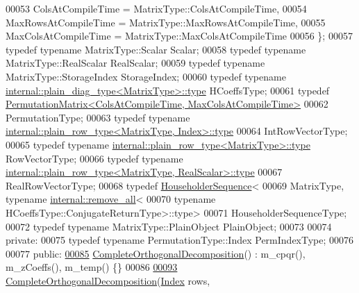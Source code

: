 \begin{DoxyCode}
00053     ColsAtCompileTime = MatrixType::ColsAtCompileTime,
00054     MaxRowsAtCompileTime = MatrixType::MaxRowsAtCompileTime,
00055     MaxColsAtCompileTime = MatrixType::MaxColsAtCompileTime
00056   \};
00057   \textcolor{keyword}{typedef} \textcolor{keyword}{typename} MatrixType::Scalar Scalar;
00058   \textcolor{keyword}{typedef} \textcolor{keyword}{typename} MatrixType::RealScalar RealScalar;
00059   \textcolor{keyword}{typedef} \textcolor{keyword}{typename} MatrixType::StorageIndex StorageIndex;
00060   \textcolor{keyword}{typedef} \textcolor{keyword}{typename} \hyperlink{class_eigen_1_1internal_1_1_tensor_lazy_evaluator_writable}{internal::plain\_diag\_type<MatrixType>::type} 
      HCoeffsType;
00061   \textcolor{keyword}{typedef} \hyperlink{group___core___module}{PermutationMatrix<ColsAtCompileTime, MaxColsAtCompileTime>}
00062       PermutationType;
00063   \textcolor{keyword}{typedef} \textcolor{keyword}{typename} \hyperlink{class_eigen_1_1internal_1_1_tensor_lazy_evaluator_writable}{internal::plain\_row\_type<MatrixType, Index>::type}
00064       IntRowVectorType;
00065   \textcolor{keyword}{typedef} \textcolor{keyword}{typename} \hyperlink{class_eigen_1_1internal_1_1_tensor_lazy_evaluator_writable}{internal::plain\_row\_type<MatrixType>::type} 
      RowVectorType;
00066   \textcolor{keyword}{typedef} \textcolor{keyword}{typename} \hyperlink{class_eigen_1_1internal_1_1_tensor_lazy_evaluator_writable}{internal::plain\_row\_type<MatrixType, RealScalar>::type}
00067       RealRowVectorType;
00068   \textcolor{keyword}{typedef} \hyperlink{group___householder___module_class_eigen_1_1_householder_sequence}{HouseholderSequence}<
00069       MatrixType, \textcolor{keyword}{typename} \hyperlink{struct_eigen_1_1internal_1_1remove__all}{internal::remove\_all}<
00070                       \textcolor{keyword}{typename} HCoeffsType::ConjugateReturnType>::type>
00071       HouseholderSequenceType;
00072   \textcolor{keyword}{typedef} \textcolor{keyword}{typename} MatrixType::PlainObject PlainObject;
00073 
00074  \textcolor{keyword}{private}:
00075   \textcolor{keyword}{typedef} \textcolor{keyword}{typename} PermutationType::Index PermIndexType;
00076 
00077  \textcolor{keyword}{public}:
\hyperlink{group___q_r___module_a7ba33814fd3fdc62f6179cdcd655c679}{00085}   \hyperlink{group___q_r___module_a7ba33814fd3fdc62f6179cdcd655c679}{CompleteOrthogonalDecomposition}() : m\_cpqr(), m\_zCoeffs(), m\_temp() \{\}
00086 
\hyperlink{group___q_r___module_aa6c282dd7452ebe754024edb71bebd09}{00093}   \hyperlink{group___q_r___module_aa6c282dd7452ebe754024edb71bebd09}{CompleteOrthogonalDecomposition}(\hyperlink{namespace_eigen_a62e77e0933482dafde8fe197d9a2cfde}{Index} rows, 

\end{DoxyCode}
